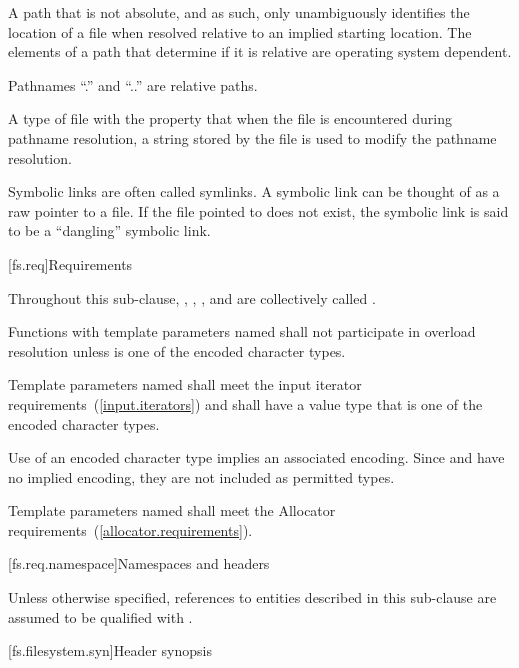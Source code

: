 A path that is not absolute, and as such, only unambiguously
identifies the location of a file when resolved relative to
an implied starting location. The elements of a path that determine if it is
relative are operating system dependent.
\begin{note}
Pathnames ``.'' and ``..'' are relative paths.
\end{note}

A type of file with the
property that when the file is encountered during pathname resolution, a string
stored by the file is used to modify the pathname resolution.
\begin{note} Symbolic links are often called symlinks. A symbolic link can be thought of as a raw pointer to a file.
If the file pointed to does not exist, the symbolic link is said to be a
``dangling'' symbolic link.\end{note}

[fs.req]{Requirements}

\pnum
Throughout this sub-clause, , ,
, and  are collectively called
.

\pnum
Functions with template parameters named 
shall not participate in overload resolution
unless  is one of the encoded character types.

\pnum
Template parameters named  shall meet the
input iterator requirements~(\ref{input.iterators}) and shall
have a value type that is one of the encoded character types.

\pnum
\begin{note} Use of an encoded character type implies an associated
encoding. Since  and  have no
implied encoding, they are not included as permitted types. \end{note}

\pnum
Template parameters named  shall meet the
Allocator requirements~(\ref{allocator.requirements}).

[fs.req.namespace]{Namespaces and headers}

\pnum
Unless otherwise specified, references to entities described in this
sub-clause are assumed to be qualified with .

[fs.filesystem.syn]{Header  synopsis}

